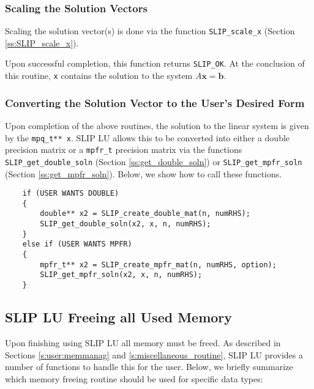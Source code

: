 \documentclass[12pt]{article}
\theoremstyle{definition}
\begin{document}
\subsubsection{Scaling the Solution Vectors}

Scaling the solution vector(s) is done via the function \verb|SLIP_scale_x|
(Section \ref{ss:SLIP_scale_x}).

Upon successful completion, this function returns \verb|SLIP_OK|. At the
conclusion of this routine, \verb|x| contains the solution to the system $A
\mathbf{x} = \mathbf{b}$.

\subsubsection{Converting the Solution Vector to the User's Desired Form}

Upon completion of the above routines, the solution to the linear system is
given by the \verb|mpq_t** x|. SLIP LU allows this to be converted into either
a double precision matrix or a \verb|mpfr_t| precision matrix via the functions
\verb|SLIP_get_double_soln| (Section \ref{ss:get_double_soln}) or
\verb|SLIP_get_mpfr_soln| (Section \ref{ss:get_mpfr_soln}). Below, we show how
to call these functions.

{\small
\begin{verbatim}
    if (USER WANTS DOUBLE)
    {
        double** x2 = SLIP_create_double_mat(n, numRHS);
        SLIP_get_double_soln(x2, x, n, numRHS);
    }
    else if (USER WANTS MPFR)
    {
        mpfr_t** x2 = SLIP_create_mpfr_mat(n, numRHS, option);
        SLIP_get_mpfr_soln(x2, x, n, numRHS);
    } \end{verbatim}}

\cprotect\subsection{SLIP LU Freeing all Used Memory}
\label{s:Using:free}

Upon finishing using SLIP LU all memory must be freed. As described in Sections
\ref{s:user:memmanag} and \ref{s:miscellaneous_routine}, SLIP LU provides a
number of functions to handle this for the user. Below, we briefly summarize
which memory freeing routine should be used for specific data types:
\end{document}
